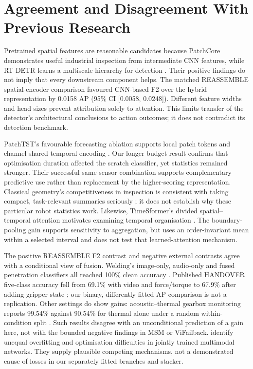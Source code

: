 \section{Agreement and Disagreement With Previous Research}
Pretrained spatial features are reasonable candidates because PatchCore demonstrates
useful industrial inspection from intermediate CNN features, while RT-DETR learns a
multiscale hierarchy for detection \parencite{Roth2022Towards,Zhao2024RTDETR}. Their
positive findings do not imply that every downstream component helps. The matched
REASSEMBLE spatial-encoder comparison favoured CNN-based F2 over the hybrid
representation by 0.0158 AP (95\% CI [0.0058, 0.0248]). Different feature widths and head
sizes prevent attribution solely to attention. This limits transfer of the detector's
architectural conclusions to action outcomes; it does not contradict its detection
benchmark.

PatchTST's favourable forecasting ablation supports local patch tokens and channel-shared
temporal encoding \parencite{Nie2023PatchTST}. Our longer-budget result confirms that
optimisation duration affected the scratch classifier, yet statistics remained stronger.
Their successful same-sensor combination supports complementary predictive use rather
than replacement by the higher-scoring representation. Classical geometry's
competitiveness in inspection is consistent with taking compact, task-relevant summaries
seriously \parencite{Horwitz2023Back}; it does not establish why these particular robot
statistics work. Likewise, TimeSformer's divided spatial--temporal attention motivates
examining temporal organisation \parencite{P034}. The boundary-pooling gain supports
sensitivity to aggregation, but uses an order-invariant mean within a selected interval
and does not test that learned-attention mechanism.

The positive REASSEMBLE F2 contrast and negative external contrasts agree with a
conditional view of fusion. Welding's image-only, audio-only and fused penetration
classifiers all reached 100\% clean accuracy \parencite[Tables~1--3]{Hua2026Weld}. Published
HANDOVER five-class accuracy fell from 69.1\% with video and force/torque to 67.9\%
after adding gripper state \parencite[Table~III]{Thoduka2024Handover}; our binary,
differently fitted AP comparison is not a replication. Other settings do show gains:
acoustic--thermal gearbox monitoring reports 99.54\% against 90.54\% for thermal alone
under a random within-condition split \parencite[Table~2]{Ying2025Trustworthy}. Such results
disagree with an unconditional prediction of a gain here, not with the bounded negative
findings in MSM or ViFailback. \textcite{Wang2020What} identify unequal overfitting and
optimisation difficulties in jointly trained multimodal networks.
They supply plausible competing mechanisms, not a demonstrated cause of losses in our
separately fitted branches and stacker.

